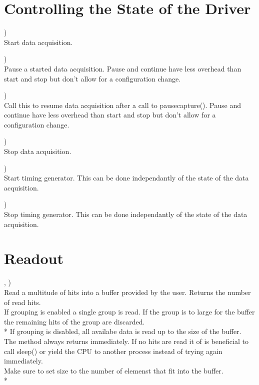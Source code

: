 	\section{Controlling the State of the Driver}
		\device)\\
		Start data acquisition.\par

		\device)\\
		Pause a started data acquisition. 
		Pause and continue have less overhead than start and stop but don't allow for a configuration change.\par

		\device)\\
		Call this to resume data acquisition after a call to \textsf{\prefix pause\tu capture()}.
		Pause and continue have less overhead than start and stop but don't allow for a configuration change.\par

		\device)\\
		Stop data acquisition.\par

		\device)\\
		Start timing generator. This can be done independantly of the state of the data acquisition.\par

		\device)\\
		Stop timing generator. This can be done independantly of the state of the data acquisition.\par

\section{Readout}

\device,    )\\
Read a multitude of hits into a buffer provided by the user. Returns the number of read hits.\\
If grouping is enabled a single group is read. 
If the group is to large for the buffer the remaining hits of the group are discarded.\\*
If grouping is disabled, all availabe data is read up to the size of the buffer. \\
The method always returns immediately. If no hits are read it of is beneficial to call \textsf{sleep()} 
or yield the CPU to another process instead of trying again immediately.\\
Make sure to set \textsf{size} to the number of elemenst that fit into the buffer.\\*




